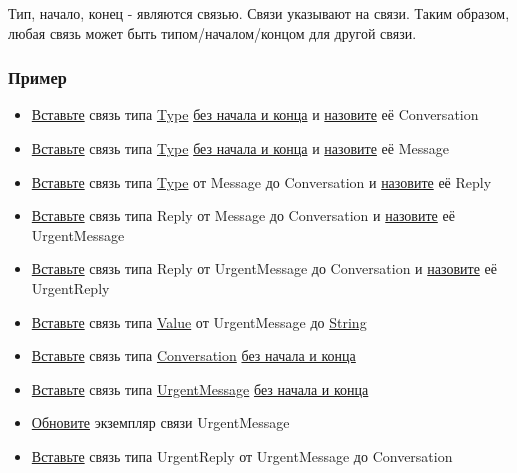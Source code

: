 \documentclass{article}
\begin{document}
Тип, начало, конец - являются связью. Связи указывают на связи. Таким образом,
любая связь может быть типом/началом/концом для другой связи.

\subsubsection{Пример}
\begin{itemize}
  \item \hyperlink{DeepCase.InsertLink.Description}{Вставьте} связь типа
        \hyperlink{Core.Type.Description}{Type}
        \hyperlink{FAQ.HowToInsertLinkWithoutFromAndTo}{без
          начала и конца} и \hyperlink{FAQ.HowToSetName}{назовите} её
        Conversation
  \item \hyperlink{DeepCase.InsertLink.Description}{Вставьте} связь типа
        \hyperlink{Core.Type.Description}{Type}
        \hyperlink{FAQ.HowToInsertLinkWithoutFromAndTo}{без
          начала и конца} и
        \hyperlink{FAQ.HowToSetName}{назовите} её Message
  \item \hyperlink{DeepCase.InsertLink.Description}{Вставьте} связь типа
        \hyperlink{Core.Type.Description}{Type} от Message до Conversation
        и
        \hyperlink{FAQ.HowToSetName}{назовите} её Reply
  \item \hyperlink{DeepCase.InsertLink.Description}{Вставьте} связь типа
        Reply
        от
        Message до Conversation и \hyperlink{FAQ.HowToSetName}{назовите} её
        UrgentMessage
  \item \hyperlink{DeepCase.InsertLink.Description}{Вставьте} связь типа
        Reply
        от
        UrgentMessage до Conversation и
        \hyperlink{FAQ.HowToSetName}{назовите}
        её
        UrgentReply
  \item \hyperlink{DeepCase.InsertLink.Description}{Вставьте} связь типа
        \hyperlink{Core.Value.Description}{Value} от UrgentMessage до
        \hyperlink{Core.String.Description}{String}
  \item \hyperlink{DeepCase.InsertLink.Description}{Вставьте} связь типа
        \hyperlink{Core.Type.Description}{Conversation}
        \hyperlink{FAQ.HowToInsertLinkWithoutFromAndTo}{без начала и конца}
  \item \hyperlink{DeepCase.InsertLink.Description}{Вставьте} связь типа
        \hyperlink{Core.Type.Description}{UrgentMessage}
        \hyperlink{FAQ.HowToInsertLinkWithoutFromAndTo}{без начала и конца}
  \item \hyperlink{DeepCase.UpdateLink.Description}{Обновите} экземпляр
        связи
        UrgentMessage
  \item \hyperlink{DeepCase.InsertLink.Description}{Вставьте} связь типа
        UrgentReply от
        UrgentMessage до Conversation
\end{itemize}
\end{document}
